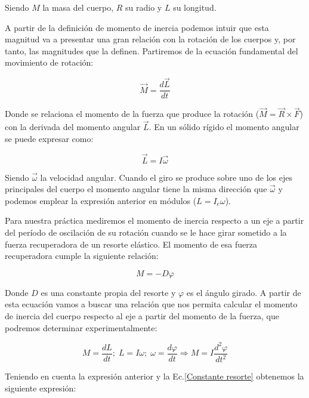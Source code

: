 \documentclass[a4paper,12pt,titlepage]{article}
\begin{document}
Siendo $M$ la masa del cuerpo, $R$ su radio y $L$ su longitud.
\par A partir de la definición de momento de inercia podemos intuir que esta magnitud va a presentar una gran relación con la rotación de los cuerpos y, por tanto, las magnitudes que la definen. Partiremos de la ecuación fundamental del movimiento de rotación:

\begin{equation}
    \vec{M} = \frac{d\vec{L}}{dt}
\end{equation}

Donde se relaciona el momento de la fuerza que produce la rotación ($\vec{M}=\vec{R}\times \vec{F}$) con la derivada del momento angular $\vec{L}$. En un sólido rígido el momento angular se puede expresar como:

\begin{equation}
    \vec{L} = I \vec{\omega}
\end{equation}

Siendo $\vec{\omega}$ la velocidad angular. Cuando el giro se produce sobre uno de los ejes principales del cuerpo el momento angular tiene la misma dirección que $\vec{\omega}$ y podemos emplear la expresión anterior en módulos ($L=I_e\omega$).

\par Para nuestra práctica mediremos el momento de inercia respecto a un eje a partir del período de oscilación de su rotación cuando se le hace girar sometido a la fuerza recuperadora de un resorte elástico. El momento de esa fuerza recuperadora cumple la siguiente relación:

\begin{equation}
    M = -D\varphi
    \label{Constante resorte}
\end{equation}

Donde $D$ es una constante propia del resorte y $\varphi$ es el ángulo girado. A partir de esta ecuación vamos a buscar una relación que nos permita calcular el momento de inercia del cuerpo respecto al eje a partir del momento de la fuerza, que podremos determinar experimentalmente:

\begin{equation}
    M = \frac{dL}{dt};\; L=I\omega;\; \omega = \frac{d\varphi}{dt} \Rightarrow M = I \frac{d^2\varphi}{dt^2}
\end{equation}

Teniendo en cuenta la expresión anterior y la Ec.\ref{Constante resorte} obtenemos la siguiente expresión:
\end{document}
